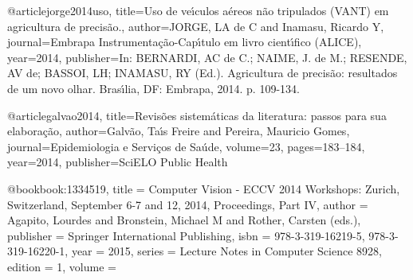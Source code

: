 @article{jorge2014uso,
  title={Uso de ve{\'\i}culos a{\'e}reos n{\~a}o tripulados (VANT) em agricultura de precis{\~a}o.},
  author={JORGE, LA de C and Inamasu, Ricardo Y},
  journal={Embrapa Instrumenta{\c{c}}{\~a}o-Cap{\'\i}tulo em livro cient{\'\i}fico (ALICE)},
  year={2014},
  publisher={In: BERNARDI, AC de C.; NAIME, J. de M.; RESENDE, AV de; BASSOI, LH; INAMASU, RY (Ed.). Agricultura de precis{\~a}o: resultados de um novo olhar. Bras{\'\i}lia, DF: Embrapa, 2014. p. 109-134.}
}

@article{galvao2014,
  title={Revis{\~o}es sistem{\'a}ticas da literatura: passos para sua elabora{\c{c}}{\~a}o},
  author={Galv{\~a}o, Ta{\'\i}s Freire and Pereira, Mauricio Gomes},
  journal={Epidemiologia e Servi{\c{c}}os de Sa{\'u}de},
  volume={23},
  pages={183--184},
  year={2014},
  publisher={SciELO Public Health}
}

@book{book:1334519,
   title =     {Computer Vision - ECCV 2014 Workshops: Zurich, Switzerland, September 6-7 and 12, 2014, Proceedings, Part IV},
   author =    {Agapito, Lourdes and Bronstein, Michael M and Rother, Carsten (eds.)},
   publisher = {Springer International Publishing},
   isbn =      {978-3-319-16219-5, 978-3-319-16220-1},
   year =      {2015},
   series =    {Lecture Notes in Computer Science 8928},
   edition =   {1},
   volume =    {}
}

